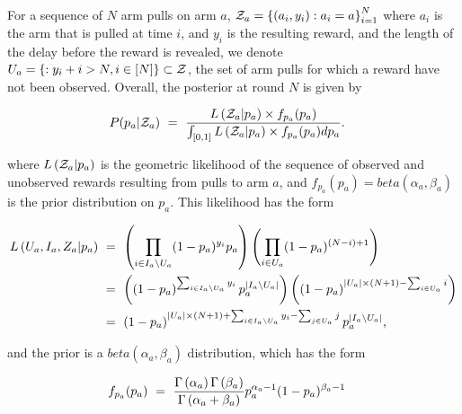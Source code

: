 \documentclass{article}
\begin{document}
For a sequence of $N$ arm pulls on arm $a$, $\mathcal{Z}_a = \left \{ (a_i, y_i) : a_i = a \right \}_{i=1}^N$ where $a_i$ is the arm that is pulled at time $i$, and $y_i$ is the resulting reward, and the length of the delay before the reward is revealed, we denote $U_a = \left \{  : y_i + i > N, i \in [N] \right \} \subset \mathcal{Z}$, the set of arm pulls for which a reward have not been observed. Overall, the posterior at round $N$ is given by

\begin{align*}
    P( p_a | \mathcal{Z}_a )\ &=\ \frac{L \left( \mathcal{Z}_a | p_a \right) \times f_{p_a}(p_a)}{\int_{[0,1]} L \left( \mathcal{Z}_a | p_a \right) \times f_{p_a}(p_a) dp_a} \textnormal{.}
\end{align*}

\noindent where $L \left( \mathcal{Z}_a | p_a \right)$ is the geometric likelihood of the sequence of observed and unobserved rewards resulting from pulls to arm $a$, and $f_{p_a}(p_a) = beta(\alpha_a, \beta_a)$ is the prior distribution on $p_a$. This likelihood has the form

\begin{align*}
	L \left( U_a, I_a, Z_a | p_a \right)\ &=\ \left( \prod_{i \in I_a \setminus U_a} (1 - p_a)^{y_i} p_a \right) \left( \prod_{i \in U_a} (1-p_a)^{(N-i)+1} \right)\\
	&=\ \left( \left( 1 - p_a \right)^{\sum_{i \in I_a \setminus U_a}y_i} p_a^{|I_a \setminus U_a|} \right) \left( \left( 1 - p_a \right)^{|U_a| \times (N + 1) - \sum_{i \in U_a} i} \right)\\
	&=\ \left( 1 - p_a \right)^{|U_a| \times (N + 1) + \sum_{i \in I_a \setminus U_a} y_i - \sum_{j \in U_a} j} p_a^{|I_a \setminus U_a|} \textnormal{,}
\end{align*}

\noindent and the prior is a $beta(\alpha_a, \beta_a)$ distribution, which has the form

\begin{align*}
	f_{p_a}(p_a)\ &=\ \frac{\Gamma \left( \alpha_a \right) \Gamma \left( \beta_a \right)}{\Gamma \left( \alpha_a + \beta_a \right)} p_a^{\alpha_a - 1}(1 - p_a)^{\beta_a - 1}
\end{align*}
\end{document}
